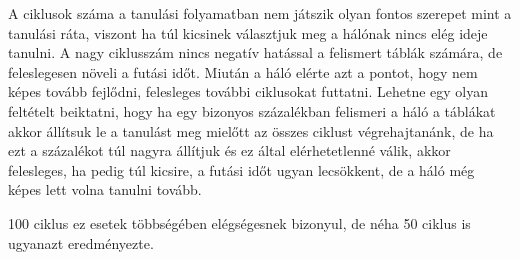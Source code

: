 A ciklusok száma a tanulási folyamatban nem játszik olyan fontos szerepet mint a tanulási ráta, viszont ha túl kicsinek választjuk meg a hálónak nincs elég ideje tanulni. A nagy ciklusszám nincs negatív hatással a felismert táblák számára, de feleslegesen növeli a futási időt. Miután a háló elérte azt a pontot, hogy nem képes tovább fejlődni, felesleges további ciklusokat futtatni. Lehetne egy olyan feltételt beiktatni, hogy ha egy bizonyos százalékban felismeri a háló a táblákat akkor állítsuk le a tanulást meg mielőtt az összes ciklust végrehajtanánk, de ha ezt a százalékot túl nagyra állítjuk és ez által elérhetetlenné válik, akkor felesleges, ha pedig túl kicsire, a futási időt ugyan lecsökkent, de a háló még képes lett volna tanulni tovább.

100 ciklus ez esetek többségében elégségesnek bizonyul, de néha 50 ciklus is ugyanazt eredményezte. 


